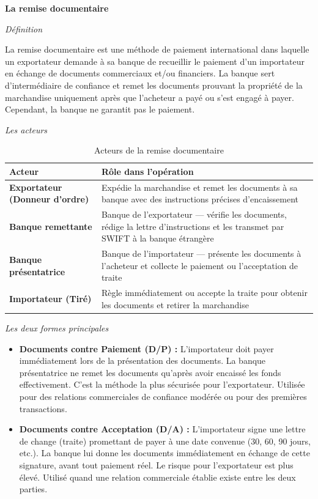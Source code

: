 \medskip\textbf{La remise documentaire}

\medskip\textit{Définition}

La remise documentaire est une méthode de paiement international dans laquelle un exportateur demande à sa banque de recueillir le paiement d'un importateur en échange de documents commerciaux et/ou financiers. La banque sert d'intermédiaire de confiance et remet les documents prouvant la propriété de la marchandise uniquement après que l'acheteur a payé ou s'est engagé à payer. Cependant, la banque ne garantit pas le paiement.

\medskip\textit{Les acteurs}

\begin{table}[h!]
\centering
\begin{tabularx}{\textwidth}{>{\bfseries}l X}
\toprule
Acteur & Rôle dans l'opération \\
\midrule
Exportateur (Donneur d'ordre) & Expédie la marchandise et remet les documents à sa banque avec des instructions précises d'encaissement \\
\addlinespace
Banque remettante & Banque de l'exportateur --- vérifie les documents, rédige la lettre d'instructions et les transmet par SWIFT à la banque étrangère \\
\addlinespace
Banque présentatrice & Banque de l'importateur --- présente les documents à l'acheteur et collecte le paiement ou l'acceptation de traite \\
\addlinespace
Importateur (Tiré) & Règle immédiatement ou accepte la traite pour obtenir les documents et retirer la marchandise \\
\bottomrule
\end{tabularx}
\caption{Acteurs de la remise documentaire}
\end{table}

\medskip\textit{Les deux formes principales}

\begin{itemize}
  \item \textbf{Documents contre Paiement (D/P) :} L'importateur doit payer immédiatement lors de la présentation des documents. La banque présentatrice ne remet les documents qu'après avoir encaissé les fonds effectivement. C'est la méthode la plus sécurisée pour l'exportateur. Utilisée pour des relations commerciales de confiance modérée ou pour des premières transactions.

  \item \textbf{Documents contre Acceptation (D/A) :} L'importateur signe une lettre de change (traite) promettant de payer à une date convenue (30, 60, 90 jours, etc.). La banque lui donne les documents immédiatement en échange de cette signature, avant tout paiement réel. Le risque pour l'exportateur est plus élevé. Utilisé quand une relation commerciale établie existe entre les deux parties.
\end{itemize}

